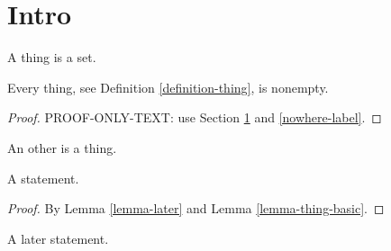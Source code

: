 \section{Intro}
\label{section-intro}

\begin{definition}
\label{definition-thing}
A thing is a set.
\end{definition}

\begin{lemma}
\label{lemma-thing-basic}
Every thing, see Definition \ref{definition-thing}, is nonempty.
\end{lemma}

\begin{proof}
PROOF-ONLY-TEXT: use Section \ref{section-intro} and \ref{nowhere-label}.
\end{proof}

\begin{definition}
\label{definition-other}
An other is a thing.
\end{definition}

\begin{lemma}
\label{lemma-uses-later}
A statement.
\end{lemma}

\begin{proof}
By Lemma \ref{lemma-later} and Lemma \ref{lemma-thing-basic}.
\end{proof}

\begin{lemma}
\label{lemma-later}
A later statement.
\end{lemma}
